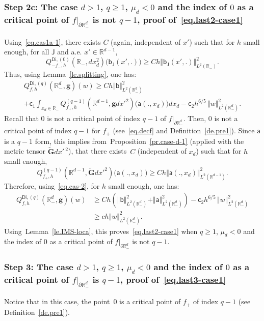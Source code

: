\documentclass[10pt]{amsart}
\newcommand{\mbf}[1]{\mathbf{#1}}
\let\pa\partial
\theoremstyle{plain}
\theoremstyle{definition}
\begin{document}
\subsubsection*{Step 2c: The case $d>1$, $q \ge 1$, $\mu_{d}<0$ and the index
of $0$ as a critical point of $f|_{\pa \mathbb R^{d}_-}$ is not $q-1$, proof of~\eqref{eq.last2-case1}}
Using~\eqref{eq.cas1a-1}, there exists $C$ (again, independent of $x'$) such that for $h$ small enough, for all $\mathsf J$ and a.e. $x'\in \mathbb R^{d-1}$,
\begin{equation}\label{cas-lambda<0}
Q^{\mathsf{Di},(0)}_{-f_-,h}(\mathbb R_-,dx_d^2)\bigl(\mathsf b_{\mathsf J}(x',.)\bigr) \ge Ch \Vert \mathsf b_{\mathsf J}(x',.) \Vert_{L^2(\mathbb R_-)}^2.
\end{equation}
Thus, using Lemma~\ref{le.splitting}, one has:
\begin{multline}\label{eq.cas-2}
Q^{\mathsf{Di},(q)}_{f,h}(\mathbb R_-^d, \mbf g)(w)\ge Ch \Vert \mathsf b \Vert_{L^2(\mathbb R^d_-)}^2\\
+\mathsf c_1\int_{x_d\in \mathbb R_- } Q^{(q-1)}_{f_+,h}(\mathbb R^{d-1}, \mbf gdx'^2)\bigl(\mathsf a(.,x_d)\bigr) dx_d
-\mathsf c_2h^{6/5}\, \Vert w \Vert_{L^2(\mathbb R^d_-)}^2.
\end{multline}
Recall that $0$ is not a critical point of index $q-1$ of $f|_{\pa \mathbb R^{d}_-}$. Then, $0$ is not a critical point of index $q-1$ for $f_+$ (see~\eqref{eq.decf} and Definition~\ref{de.pre1}). Since $\mathsf a$ is a $q-1$ form, this implies from~Proposition~\ref{pr.case-d-1} (applied with the metric tensor $ \tilde {\mbf G}dx'\,^2$), that there exists~$C$ (independent of $x_d$) such that for $h$ small enough,
\[
Q^{(q-1)}_{f_+,h}(\mathbb R^{d-1}, \tilde {\mbf G}dx'^2)\bigl(\mathsf a(.,x_d)\bigr) \ge Ch \Vert \mathsf a(.,x_d) \Vert_{L^2(\mathbb R^{d-1})}^2.
\]
Therefore, using~\eqref{eq.cas-2}, for $h$ small enough, one has:
\[
\begin{aligned}
Q^{\mathsf{Di},(q)}_{f,h}(\mathbb R^{d}_-, \mbf g)(w)&\ge Ch(\Vert
\mathsf b \Vert_{L^2(\mathbb R^d_-)}^2+ \Vert \mathsf a
\Vert_{L^2(\mathbb R^{d}_-)}^2)-\mathsf c_2h^{6/5}\, \Vert w
\Vert_{L^2(\mathbb R^d_-)}^2 \\
&\ge ch \Vert w \Vert_{L^2(\mathbb R^d_-)}^2.
\end{aligned}
\]
Using~Lemma~\ref{le.IMS-loca}, this proves~\eqref{eq.last2-case1} when
$q\ge 1$, $\mu_{d}<0$ and the index of $0$ as a critical point of
$f|_{\pa \mathbb R^{d}_-}$ is not $q-1$.

\subsubsection*{Step 3: The case $d>1$, $q \ge 1$, $\mu_{d}<0$ and the index
of $0$ as a critical point of $f|_{\pa \mathbb R^{d}_-}$ is $q-1$, proof of~\eqref{eq.last3-case1}}
Notice that in this case, the point~$0$ is a critical point of $f_+$ of index $q-1$ (see Definition~\ref{de.pre1}).
\end{document}
